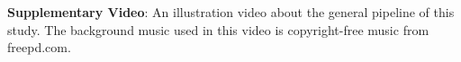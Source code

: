 \supplementarysection

\noindent \textbf{Supplementary Video}: An illustration video about the general pipeline of this study. The background music used in this video is copyright-free music from freepd.com.







\newpage

\begin{landscape}
  
\end{landscape}

\newpage

\begin{landscape}
  
\end{landscape}
